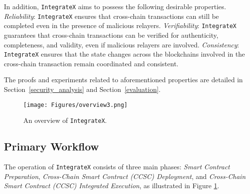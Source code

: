 In addition, \texttt{IntegrateX} aims to possess the following desirable properties. 
\emph{Reliability}: \texttt{IntegrateX} ensures that cross-chain transactions can still be completed even in the presence of malicious relayers. 
\emph{Verifiability}: \texttt{IntegrateX} guarantees that cross-chain transactions can be verified for authenticity, completeness, and validity, even if malicious relayers are involved. 
\emph{Consistency}: \texttt{IntegrateX} ensures that the state changes across the blockchains involved in the cross-chain transaction remain coordinated and consistent. 

The proofs and experiments related to aforementioned properties are detailed in Section~\ref{security_analysis} and Section~\ref{evaluation}.



\begin{figure}[t]
    \centering
    \texttt{[image: Figures/overview3.png]}
    \vspace{-18pt}
    \caption{An overview of \texttt{IntegrateX}. 
    }
    \label{overview}
\end{figure} 



\subsection{Primary Workflow}

The operation of \texttt{IntegrateX} consists of three main phases: \emph{Smart Contract Preparation}, \emph{Cross-Chain Smart Contract (CCSC) Deployment}, and \emph{Cross-Chain Smart Contract (CCSC) Integrated Execution}, as illustrated in Figure \ref{overview}.



